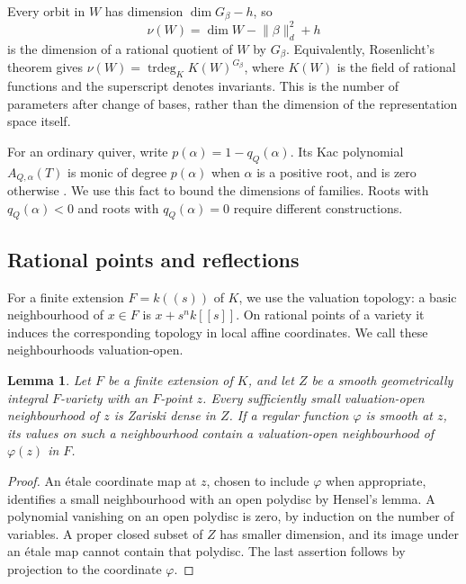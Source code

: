 \documentclass[11pt, reqno]{amsart}
\numberwithin{equation}{section}
\newtheorem{lemma}[theorem]{Lemma}
\theoremstyle{definition}
\theoremstyle{remark}
\newcommand{\op}[1]{\operatorname{#1}}
\begin{document}
Every orbit in $W$ has dimension $\dim G_\beta-h$, so
\[ \nu(W)=\dim W-\lVert\beta\rVert_d^2+h \]
is the dimension of a rational quotient of $W$ by $G_\beta$. Equivalently,
Rosenlicht's theorem gives
$\nu(W)=\op{trdeg}_K K(W)^{G_\beta}$, where $K(W)$ is the
field of rational functions and the superscript denotes invariants.
This is the number of
parameters after change of bases, rather than the dimension of the
representation space itself.

For an ordinary quiver, write $p(\alpha)=1-q_Q(\alpha)$. Its Kac
polynomial $A_{Q,\alpha}(T)$ is monic of degree $p(\alpha)$ when
$\alpha$ is a positive root, and is zero otherwise \cite{Kac83,HLRV}.
We use this fact to bound the dimensions of families. Roots with
$q_Q(\alpha)<0$ and roots with $q_Q(\alpha)=0$ require different
constructions.

\subsection{Rational points and reflections}
For a finite extension $F=k((s))$ of $K$, we use the valuation topology:
a basic neighbourhood of $x\in F$ is $x+s^n k[[s]]$. On rational
points of a variety it induces the corresponding topology in local
affine coordinates. We call these neighbourhoods valuation-open.

\begin{lemma}\label{lem:henseldense}
Let $F$ be a finite extension of $K$, and let $Z$ be a smooth
geometrically integral $F$-variety with an $F$-point $z$. Every
sufficiently small valuation-open neighbourhood of $z$ is Zariski
dense in $Z$. If a regular function $\varphi$ is smooth at $z$, its values
on such a neighbourhood contain a valuation-open neighbourhood of
$\varphi(z)$ in $F$.
\end{lemma}
\begin{proof}
An \'etale coordinate map at $z$, chosen to include $\varphi$ when appropriate,
identifies a small neighbourhood with an open polydisc by Hensel's
lemma. A polynomial vanishing on an open polydisc is zero, by induction
on the number of variables. A proper closed subset of $Z$ has smaller
dimension, and its image under an \'etale map cannot contain that
polydisc. The last assertion follows by projection to the coordinate
$\varphi$.
\end{proof}
\end{document}
